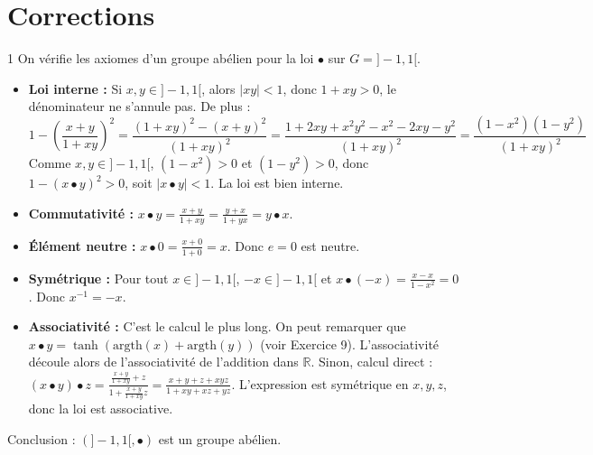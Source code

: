 \newpage
\section{Corrections}

\begin{correction}{1}
On vérifie les axiomes d'un groupe abélien pour la loi $\bullet$ sur $G=]-1,1[$.
\begin{itemize}
    \item \textbf{Loi interne :} Si $x,y \in ]-1,1[$, alors $|xy| < 1$, donc $1+xy > 0$, le dénominateur ne s'annule pas. De plus :
    $$ 1 - \left(\frac{x+y}{1+xy}\right)^2 = \frac{(1+xy)^2 - (x+y)^2}{(1+xy)^2} = \frac{1+2xy+x^2y^2 - x^2-2xy-y^2}{(1+xy)^2} = \frac{(1-x^2)(1-y^2)}{(1+xy)^2} $$
    Comme $x,y \in ]-1,1[$, $(1-x^2) > 0$ et $(1-y^2) > 0$, donc $1 - (x \bullet y)^2 > 0$, soit $|x \bullet y| < 1$. La loi est bien interne.
    \item \textbf{Commutativité :} $x \bullet y = \frac{x+y}{1+xy} = \frac{y+x}{1+yx} = y \bullet x$.
    \item \textbf{Élément neutre :} $x \bullet 0 = \frac{x+0}{1+0} = x$. Donc $e=0$ est neutre.
    \item \textbf{Symétrique :} Pour tout $x \in ]-1,1[$, $-x \in ]-1,1[$ et $x \bullet (-x) = \frac{x-x}{1-x^2} = 0$. Donc $x^{-1} = -x$.
    \item \textbf{Associativité :} C'est le calcul le plus long. On peut remarquer que $x \bullet y = \tanh(\text{argth}(x) + \text{argth}(y))$ (voir Exercice 9). L'associativité découle alors de l'associativité de l'addition dans $\mathbb{R}$.
    Sinon, calcul direct :
    $(x \bullet y) \bullet z = \frac{\frac{x+y}{1+xy} + z}{1 + \frac{x+y}{1+xy}z} = \frac{x+y+z+xyz}{1+xy+xz+yz}$.
    L'expression est symétrique en $x,y,z$, donc la loi est associative.
\end{itemize}
Conclusion : $(]-1,1[, \bullet)$ est un groupe abélien.
\end{correction}

